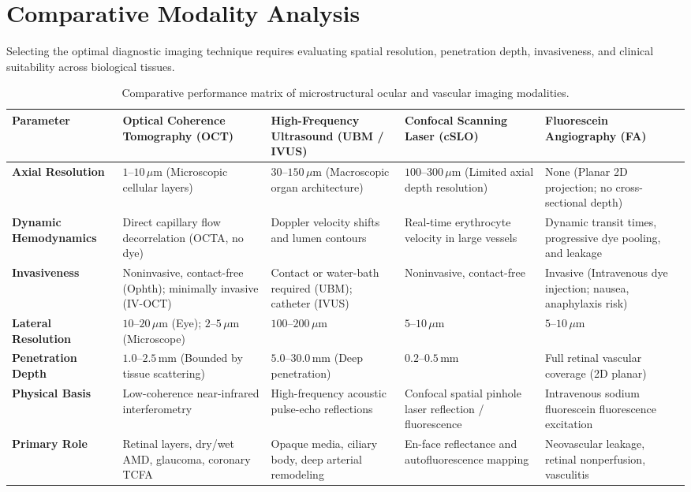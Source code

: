 \documentclass[11pt,a4paper]{article}
\begin{document}
\section{Comparative Modality Analysis}

Selecting the optimal diagnostic imaging technique requires evaluating spatial resolution, penetration depth, invasiveness, and clinical suitability across biological tissues.

\begin{table}[htbp]
\centering
\small
\setlength{\tabcolsep}{3pt}
\begin{tabular}{p{2.6cm}p{2.8cm}p{2.9cm}p{2.8cm}p{2.9cm}}
\toprule
\textbf{Parameter} & \textbf{Optical Coherence Tomography (OCT)} & \textbf{High-Frequency Ultrasound (UBM / IVUS)} & \textbf{Confocal Scanning Laser (cSLO)} & \textbf{Fluorescein Angiography (FA)} \\
\midrule
\textbf{Axial Resolution} & $1\text{--}10\,\mu\text{m}$ (Microscopic cellular layers) & $30\text{--}150\,\mu\text{m}$ (Macroscopic organ architecture) & $100\text{--}300\,\mu\text{m}$ (Limited axial depth resolution) & None (Planar 2D projection; no cross-sectional depth) \\
\addlinespace
\textbf{Dynamic Hemodynamics} & Direct capillary flow decorrelation (OCTA, no dye) & Doppler velocity shifts and lumen contours & Real-time erythrocyte velocity in large vessels & Dynamic transit times, progressive dye pooling, and leakage \\
\addlinespace
\textbf{Invasiveness} & Noninvasive, contact-free (Ophth); minimally invasive (IV-OCT) & Contact or water-bath required (UBM); catheter (IVUS) & Noninvasive, contact-free & Invasive (Intravenous dye injection; nausea, anaphylaxis risk) \\
\addlinespace
\textbf{Lateral Resolution} & $10\text{--}20\,\mu\text{m}$ (Eye); $2\text{--}5\,\mu\text{m}$ (Microscope) & $100\text{--}200\,\mu\text{m}$ & $5\text{--}10\,\mu\text{m}$ & $5\text{--}10\,\mu\text{m}$ \\
\addlinespace
\textbf{Penetration Depth} & $1.0\text{--}2.5\,\text{mm}$ (Bounded by tissue scattering) & $5.0\text{--}30.0\,\text{mm}$ (Deep penetration) & $0.2\text{--}0.5\,\text{mm}$ & Full retinal vascular coverage (2D planar) \\
\addlinespace
\textbf{Physical Basis} & Low-coherence near-infrared interferometry & High-frequency acoustic pulse-echo reflections & Confocal spatial pinhole laser reflection / fluorescence & Intravenous sodium fluorescein fluorescence excitation \\
\addlinespace
\textbf{Primary Role} & Retinal layers, dry/wet AMD, glaucoma, coronary TCFA & Opaque media, ciliary body, deep arterial remodeling & En-face reflectance and autofluorescence mapping & Neovascular leakage, retinal nonperfusion, vasculitis \\
\bottomrule
\end{tabular}
\caption{Comparative performance matrix of microstructural ocular and vascular imaging modalities.}
\label{tab:modality_comparison}
\end{table}
\end{document}
